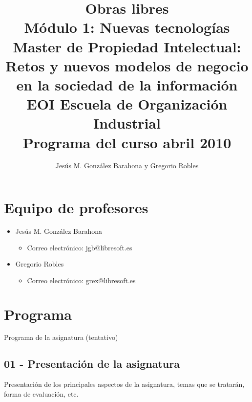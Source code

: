 \documentclass[a4paper,12pt]{article}
\title{Obras libres \\
Módulo 1: Nuevas tecnologías \\
Master de Propiedad Intelectual: \\
Retos y nuevos modelos de negocio en la sociedad de la información \\
EOI Escuela de Organización Industrial \\
Programa del curso abril 2010}
\author{Jesús M. González Barahona y Gregorio Robles}
\begin{document}
\maketitle

\newpage

\tableofcontents

\newpage

\section{Equipo de profesores}

\begin{itemize}
\item Jesús M. González Barahona
  \begin{itemize}
  \item Correo electrónico: jgb@libresoft.es
  \end{itemize}
\item Gregorio Robles
  \begin{itemize}
  \item Correo electrónico: grex@libresoft.es
  \end{itemize}
\end{itemize}





\section{Programa}

Programa de la asignatura (tentativo)

\subsection{01 - Presentación de la asignatura}

Presentación de los principales aspectos de la asignatura, temas que se tratarán, forma de evaluación, etc.
\end{document}
